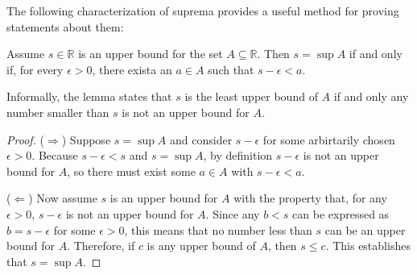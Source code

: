 \par\vspace{0.3 cm}
The following characterization of suprema provides a useful method for proving statements about them:
\par\vspace{0.3 cm}
\begin{lemma} Assume $s\in\mathbb{R}$ is an upper bound for the set $A\subseteq\mathbb{R}$.  Then $s=\sup A$ if and only if, 
for every $\epsilon>0$, there exista an $a\in A$ such that $s-\epsilon < a$.
\end{lemma}
\par\vspace{0.3 cm}
Informally, the lemma states that $s$ is the least upper bound of $A$ if and only any number smaller than $s$ is not an upper bound for $A$.
\par\vspace{0.3 cm}
\begin{proof}($\Rightarrow$) Suppose $s=\sup A$ and consider $s-\epsilon$ for some arbirtarily chosen $\epsilon>0$. Because $s-\epsilon < s$ and $s=\sup A$, by definition $s-\epsilon$ is not an upper bound for $A$, so there must exist some $a\in A$ with $s-\epsilon<a$.
\par\vspace{0.3 cm}
($\Leftarrow$) Now assume $s$ is an upper bound for $A$ with the property that, for any $\epsilon>0$, $s-\epsilon$ is not an upper bound for $A$. Since any $b<s$ can be expressed as $b=s-\epsilon$ for some $\epsilon>0$, this means that no number less than $s$ can be an upper bound for $A$.  Therefore, if $c$ is any upper bound of $A$, then $s\leq c$.  This establishes that $s=\sup A$.
\end{proof}



